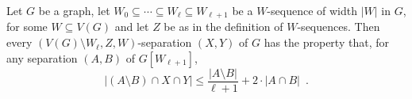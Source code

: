 \documentclass{patmorin}
\begin{document}
    




\begin{lem}\label{z_corollary}
  Let $G$ be a graph, let $W_0\subseteq\cdots\subseteq W_\ell\subseteq W_{\ell+1}$ be a $W$-sequence of width $|W|$ in $G$, for some $W\subseteq V(G)$ and let $Z$ be as in the definition of $W$-sequences.
  Then every $(V(G)\setminus W_{\ell},Z,W)$-separation $(X,Y)$ of $G$ has the property that, for any separation  
  $(A,B)$ of $G[W_{\ell+1}]$,  
  \[ 
    |(A\setminus B)\cap X\cap Y|\le \frac{|A\setminus B|}{\ell+1}+ 2\cdot|A\cap B|  \enspace .
  \]  
\end{lem}
\end{document}
